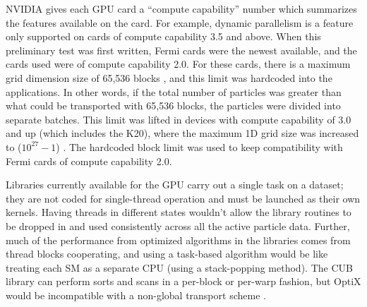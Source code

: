 %
%

NVIDIA gives each GPU card a ``compute capability'' number which summarizes the features available on the card.  For example, dynamic parallelism is a feature only supported on cards of compute capability 3.5 and above.  When this preliminary test was first written, Fermi cards were the newest available, and the cards used were of compute capability 2.0.  For these cards, there is a maximum grid dimension size of 65,536 blocks \cite{cuda}, and this limit was hardcoded into the applications.  In other words, if the total number of particles was greater than what could be transported with 65,536 blocks, the particles were divided into separate batches.  This limit was lifted in devices with compute capability of 3.0 and up (which includes the K20), where the maximum 1D grid size was increased to ($10^{27}-1$) \cite{cuda}. The hardcoded block limit was used to keep compatibility with Fermi cards of compute capability 2.0. %

Libraries currently available for the GPU carry out a single task on a dataset; they are not coded for single-thread operation and must be launched as their own kernels.  Having threads in different states wouldn't allow the library routines to be dropped in and used consistently across all the active particle data.  Further, much of the performance from optimized algorithms in the libraries comes from thread blocks cooperating, and using a task-based algorithm would be like treating each SM as a separate CPU (using a stack-popping method).  The CUB library can perform sorts and scans in a per-block or per-warp fashion, but OptiX would be incompatible with a non-global transport scheme \cite{optix}.


